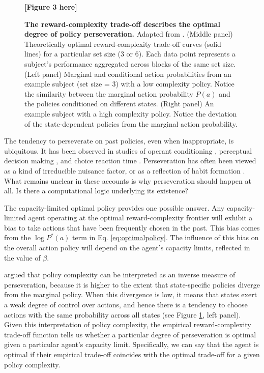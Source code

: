 \documentclass[11pt]{article}
\begin{document}
\begin{figure}
    \centering
    \textbf{[Figure 3 here]}
    \caption{\textbf{The reward-complexity trade-off describes the optimal degree of policy perseveration.} Adapted from \cite{gershman20}. (Middle panel) Theoretically optimal reward-complexity trade-off curves (solid lines) for a particular set size (3 or 6). Each data point represents a subject's performance aggregated across blocks of the same set size. (Left panel) Marginal and conditional action probabilities from an example subject (set size = 3) with a low complexity policy. Notice the similarity between the marginal action probability $P(a)$ and the policies conditioned on different states. (Right panel) An example subject with a high complexity policy. Notice the deviation of the state-dependent policies from the marginal action probability.}
    \label{fig:gershman20}
\end{figure}

The tendency to perseverate on past policies, even when inappropriate, is ubiquitous. It has been observed in studies of operant conditioning \citep{thorndike11,lau05}, perceptual decision making \citep{verplanck52,howarth56,frund14}, and choice reaction time \citep{bertelson65}. Perseveration has often been viewed as a kind of irreducible nuisance factor, or as a reflection of habit formation \citep{dickinson85,miller19}. What remains unclear in these accounts is why perseveration should happen at all. Is there a computational logic underlying its existence?

The capacity-limited optimal policy provides one possible answer. Any capacity-limited agent operating at the optimal reward-complexity frontier will exhibit a bias to take actions that have been frequently chosen in the past. This bias comes from the $\log P^\ast(a)$ term in Eq. \ref{eq:optimalpolicy}. The influence of this bias on the overall action policy will depend on the agent's capacity limits, reflected in the value of $\beta$.

\citet{gershman20} argued that policy complexity can be interpreted as an inverse measure of perseveration, because it is higher to the extent that state-specific policies diverge from the marginal policy. When this divergence is low, it means that states exert a weak degree of control over actions, and hence there is a tendency to choose actions with the same probability across all states (see Figure \ref{fig:gershman20}, left panel). Given this interpretation of policy complexity, the empirical reward-complexity trade-off function tells us whether a particular degree of perseveration is optimal given a particular agent's capacity limit. Specifically, we can say that the agent is optimal if their empirical trade-off coincides with the optimal trade-off for a given policy complexity.
\end{document}
